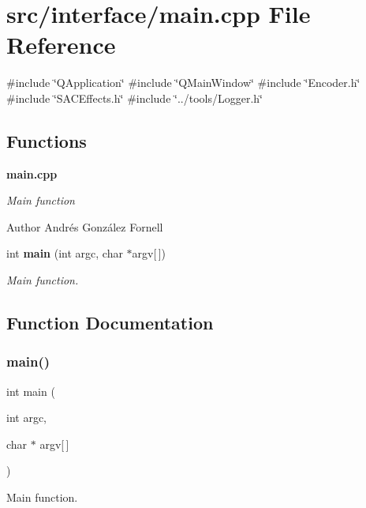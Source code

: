\section{src/interface/main.cpp File Reference}
\label{interface_2main_8cpp}
{\ttfamily \#include \char`\"{}Q\+Application\char`\"{}}\newline
{\ttfamily \#include \char`\"{}Q\+Main\+Window\char`\"{}}\newline
{\ttfamily \#include \char`\"{}Encoder.\+h\char`\"{}}\newline
{\ttfamily \#include \char`\"{}S\+A\+C\+Effects.\+h\char`\"{}}\newline
{\ttfamily \#include \char`\"{}../tools/\+Logger.\+h\char`\"{}}\newline
\subsection*{Functions}
\begin{Indent}\textbf{ main.\+cpp}\par
{\em Main function

\begin{DoxyAuthor}{Author}
Andrés González Fornell 
\end{DoxyAuthor}
}\begin{DoxyCompactItemize}
\item 
int \textbf{ main} (int argc, char $\ast$argv[$\,$])
\begin{DoxyCompactList}\small\item\em Main function. \end{DoxyCompactList}\end{DoxyCompactItemize}
\end{Indent}


\subsection{Function Documentation}
\mbox{\label{interface_2main_8cpp_a0ddf1224851353fc92bfbff6f499fa97}} 
\subsubsection{main()}
{\footnotesize\ttfamily int main (\begin{DoxyParamCaption}\item[{int}]{argc,  }\item[{char $\ast$}]{argv[$\,$] }\end{DoxyParamCaption})}



Main function. 

